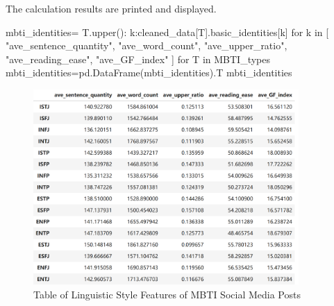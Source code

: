 \documentclass[12pt]{article}
\begin{document}
	The calculation results are printed and displayed.
	\begin{python}
mbti_identities={
    T.upper():{
        k:cleaned_data[T].basic_identities[k]
        for k in [
        "ave_sentence_quantity",
        "ave_word_count",
        "ave_upper_ratio",
        "ave_reading_ease",
        "ave_GF_index"
        ]
    }
    for T in MBTI_types
}
mbti_identities=pd.DataFrame(mbti_identities).T
mbti_identities
	\end{python}
	\begin{figure}[H]
		\centering
		\includegraphics[width=0.9\textwidth]{Q2wordchart} 
		\caption{Table of Linguistic Style Features of MBTI Social Media Posts}		
	\end{figure}
	
\end{document}
